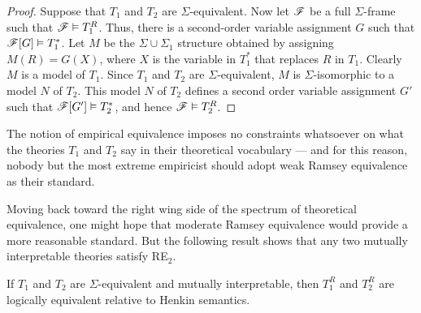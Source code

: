 \begin{proof} Suppose that $T_1$ and $T_2$ are $\Sigma$-equivalent.
  Now let $\mathscr F$ be a full $\Sigma$-frame such that $\mathscr F\vDash T_1^R$.
  Thus, there is a second-order variable assignment $G$ such that
  $\mathscr F [G]\vDash T_1^*$.  Let $M$ be the $\Sigma\cup\Sigma _1$
  structure obtained by assigning $M(R)=G(X)$, where $X$ is the
  variable in $T_1^*$ that replaces $R$ in $T_1$.  Clearly $M$ is a
  model of $T_1$.  Since $T_1$ and $T_2$ are $\Sigma$-equivalent, $M$
  is $\Sigma$-isomorphic to a model $N$ of $T_2$.  This model $N$ of
  $T_2$ defines a second order variable assignment $G'$ such that
  $\mathscr F [G']\vDash T_2^*$, and hence $\mathscr F\vDash T_2^R$.  \end{proof}

The notion of empirical equivalence imposes no constraints whatsoever
on what the theories $T_1$ and $T_2$ say in their theoretical
vocabulary --- and for this reason, nobody but the most extreme
empiricist should adopt weak Ramsey equivalence as their standard.

Moving back toward the right wing side of the spectrum of theoretical
equivalence, one might hope that moderate Ramsey equivalence would
provide a more reasonable standard.  But the following result shows
that any two mutually interpretable theories satisfy RE$_2$.

\begin{prop}[Dewar] If $T_1$ and $T_2$ are $\Sigma$-equivalent and
  mutually interpretable, then $T_1^R$ and $T_2^R$ are logically
  equivalent relative to Henkin semantics.  \end{prop}

